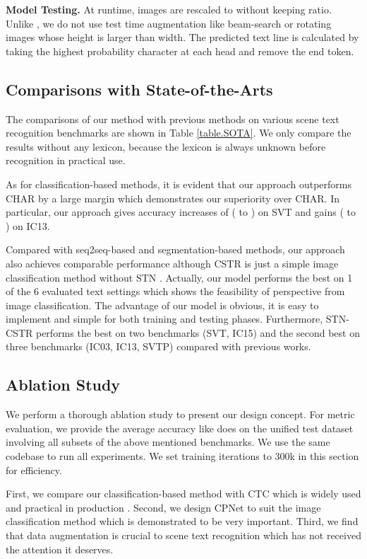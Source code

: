\documentclass[final]{cvpr}
\begin{document}
\textbf{Model Testing.}
At runtime, images are rescaled to  without keeping ratio. Unlike \cite{li2019show, litman2020scatter}, we do not use test time augmentation like beam-search or rotating images whose height is larger than width. The predicted text line is calculated by taking the highest probability character at each head and remove the end token.

\subsection{Comparisons with State-of-the-Arts}

The comparisons of our method with previous methods on various scene text recognition benchmarks are shown in Table \ref{table.SOTA}.  We only compare the results without any lexicon, because the lexicon is always unknown before recognition in practical use.

As for classification-based methods, it is evident that our approach outperforms CHAR \cite{jaderberg14c} by a large margin which demonstrates our superiority over CHAR. In particular, our approach gives accuracy increases of  ( to ) on SVT and  gains ( to ) on IC13.

Compared with seq2seq-based and segmentation-based methods, our approach also achieves comparable performance although 
CSTR is just a simple image classification method without STN \cite{shi2018aster}.
Actually, our model performs the best on 1 of the 6 evaluated text settings which shows the feasibility of perspective from image classification. The advantage of our model is obvious, it is easy to implement and simple for both training and testing phases. 
Furthermore, STN-CSTR performs the best on two benchmarks (SVT, IC15) and the second best on three benchmarks (IC03, IC13, SVTP) compared with previous works.

\subsection{Ablation Study}
\label{section.ablation_study}
We perform a thorough ablation study to present our design concept. For metric evaluation, we provide the average accuracy like \cite{baek2019wrong} does on the unified test dataset involving all subsets of the above mentioned benchmarks. We use the same codebase to run all experiments. We set training iterations to 300k in this section for efficiency.

First, we compare our classification-based method with CTC which is widely used and practical in production \cite{borisyuk2018rosetta,du2020pp}.
Second, we design CPNet to suit the image classification method which is demonstrated to be very important.
Third, we find that data augmentation is crucial to scene text recognition which has not received the attention it deserves.
\end{document}
